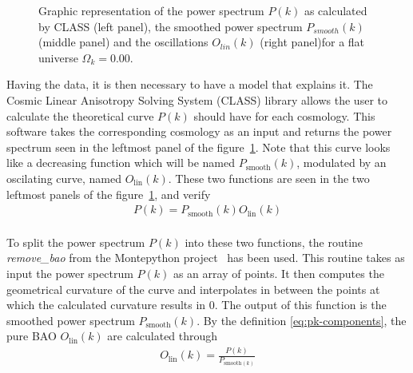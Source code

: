 \begin{figure}[t]
	\centering
	\caption{Graphic representation of the power spectrum $P(k)$ as calculated by CLASS (left panel), the smoothed power spectrum $P_{smooth}(k)$ (middle panel) and the oscillations $O_{lin}(k)$ (right panel)for a flat universe $\Omega_k = 0.00$.} \label{fig:PkOlPsm} \end{figure} Having the data, it is then necessary to have a model that explains it. The Cosmic Linear Anisotropy Solving System (CLASS) \cite{class} library allows the user to calculate the theoretical curve $P(k)$ should have for each cosmology. This software takes the corresponding cosmology as an input and returns the power spectrum seen in the leftmost panel of the figure~\ref{fig:PkOlPsm}. Note that this curve looks like a decreasing function which will be named $P_{\text{smooth}}(k)$, modulated by an oscilating curve, named $O_{\text{lin}}(k)$. These two functions are seen in the two leftmost panels of the figure~\ref{fig:PkOlPsm}, and verify \begin{align} P(k) = P_{\text{smooth}}(k) O_{\text{lin}}(k)
	\label{eq:pk-components}
\end{align}
 \\
To split the power spectrum $P(k)$ into these two functions, the routine \textit{remove\_bao} from the Montepython project~\cite{montepython} has been used. This routine takes as input the power spectrum $P(k)$ as an array of points. It then computes the geometrical curvature of the curve and interpolates in between the points at which the calculated curvature results in 0. The output of this function is the smoothed power spectrum $P_{\text{smooth}}(k)$. By the definition \eqref{eq:pk-components}, the pure BAO  $O_{\text{lin}}(k)$ are calculated through 
\begin{align}
	O_{\text{lin}}(k) = \frac{P(k)}{P_{\text{smooth}(k)}}
\end{align}

